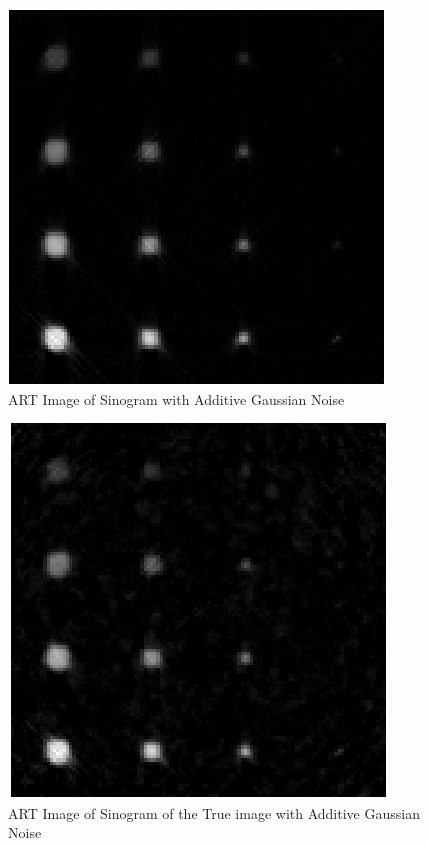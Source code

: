 \documentclass{article}
\begin{document}
\newpage
\begin{figure}[h]
  \includegraphics[width=\linewidth]{ART2.png}
  \caption{ART Image of Sinogram with Additive Gaussian Noise}\label{fbp2}
\end{figure}


\newpage
\begin{figure}[h]
  \includegraphics[width=\linewidth]{ART3.png}
  \caption{ART Image of Sinogram of the True image with Additive Gaussian Noise}\label{fbp3}
\end{figure}
\end{document}
